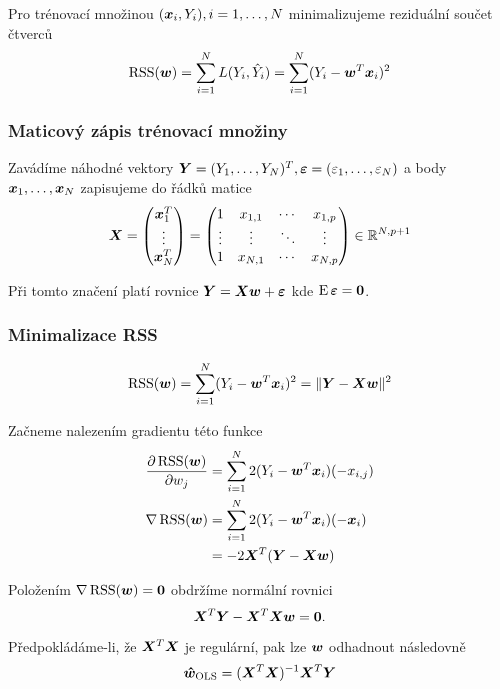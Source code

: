 \documentclass[../main.tex]{subfiles}
\begin{document}
Pro trénovací množinou $(\bm{x}_i, Y_i), i = 1, \ldots, N$ minimalizujeme reziduální součet čtverců
\[ \operatorname{RSS}(\bm{w}) = \sum_{i = 1}^{N} L(Y_i, \hat{Y}_i) = \sum_{i = 1}^{N} (Y_i - \bm{w}^T \bm{x}_i)^2 \]

\subsubsection{Maticový zápis trénovací množiny}

Zavádíme náhodné vektory $\bm{Y} = (Y_1, \ldots, Y_N)^T, \bm{\varepsilon} = (\varepsilon_1, \ldots, \varepsilon_N)$ a body $\bm{x}_1, \ldots, \bm{x}_N$ zapisujeme do řádků matice
\begin{equation*}
    \bm{X} =
    \begin{pmatrix}
        \bm{x}_1^T \\
        \vdots \\
        \bm{x}_N^T
    \end{pmatrix}
    =
    \begin{pmatrix}
        1      & x_{1,1} & \cdots & x_{1,p} \\
        \vdots & \vdots  & \ddots & \vdots  \\
        1      & x_{N,1} & \cdots & x_{N,p} \\
    \end{pmatrix}
    \in \mathbb{R}^{N, p+1}
\end{equation*}

Při tomto značení platí rovnice $\bm{Y} = \bm{X}\bm{w} + \bm{\varepsilon}$ kde $\operatorname{E} \bm{\varepsilon} = \mathbf{0}$.

\subsubsection{Minimalizace RSS}

\[ \operatorname{RSS}(\bm{w}) = \sum_{i=1}^{N} (Y_i - \bm{w}^T \bm{x}_i)^2  = \| \bm{Y} - \bm{X} \bm{w} \|^2 \]

Začneme nalezením gradientu této funkce
\begin{align*}
    \pdv{\operatorname{RSS}(\bm{w})}{w_j}
     & = \sum_{i=1}^{N} 2 (Y_i - \bm{w}^T \bm{x}_i) (-x_{i, j}) \\
    \nabla \operatorname{RSS}(\bm{w})
     & = \sum_{i=1}^{N} 2 (Y_i - \bm{w}^T \bm{x}_i) (-\bm{x}_i)     \\
     & = -2 \bm{X}^T (\bm{Y} - \bm{X}\bm{w})
\end{align*}

Položením $\nabla \operatorname{RSS}(\bm{w}) = \mathbf{0}$ obdržíme normální rovnici
\[ \bm{X}^T \bm{Y} - \bm{X}^T \bm{X}\bm{w} = \mathbf{0}. \]

Předpokládáme-li, že $\bm{X}^T\bm{X}$ je regulární, pak lze $\bm{w}$ odhadnout následovně
\[ \bm{\hat{w}}_{\text{OLS}} = (\bm{X}^T \bm{X})^{-1} \bm{X}^T \bm{Y} \]
\end{document}
